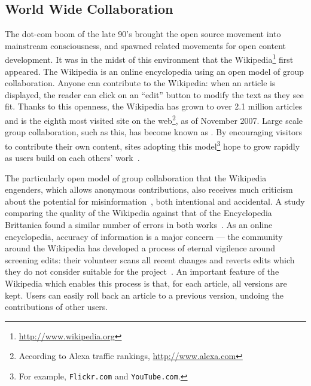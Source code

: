 \subsection{World Wide Collaboration}

The dot-com boom of the late 90's brought the open source movement into
mainstream consciousness, and spawned related movements for open
content development.
It was in the midst of this environment that the
Wikipedia\footnote{\url{http://www.wikipedia.org}}
first appeared.
The Wikipedia
is an online encyclopedia using an open model of group collaboration.
Anyone can contribute to the Wikipedia: when an article is
displayed, the reader can click on an ``edit'' button to modify
the text as they see fit.
Thanks to this openness, the Wikipedia has grown to
over 2.1 million articles  and is
the eighth most visited site on the
web\footnote{According to Alexa traffic rankings, \url{http://www.alexa.com}},
as of November 2007.
Large scale group collaboration, such as this,
has become known as . 
By encouraging visitors to contribute their own content,
sites adopting this model\footnote{For example,
\texttt{Flickr.com} and \texttt{YouTube.com}.}
hope to grow rapidly as users build on each others' work~\cite{Taylor2007}.



The particularly open model of group collaboration that the Wikipedia engenders,
which allows anonymous contributions,
also receives much criticism about the potential for
misinformation~\cite{Seigenthaler05,Stross2006,NewYorkTimes05a,TheSun06,NewZelandHerald06,BBC06,NewYorkTimes06,TheNewYorker06,BBC07},
both intentional and accidental.
A study comparing the quality of the Wikipedia against that
of the Encyclopedia Brittanica found a similar number of
errors  in both works~\cite{Giles2006}.
As an online encyclopedia, accuracy of information is a major concern ---
the community around the Wikipedia has developed a process
of eternal vigilence around screening edits: their volunteer  scans
all recent changes and reverts edits which they do not consider
suitable for the project~\cite{wiki:RCPatrol}.
An important feature of the Wikipedia which enables this
process is that, for each article,
all versions are kept.
Users can easily roll back an article to a previous version,
undoing the contributions of other users.

